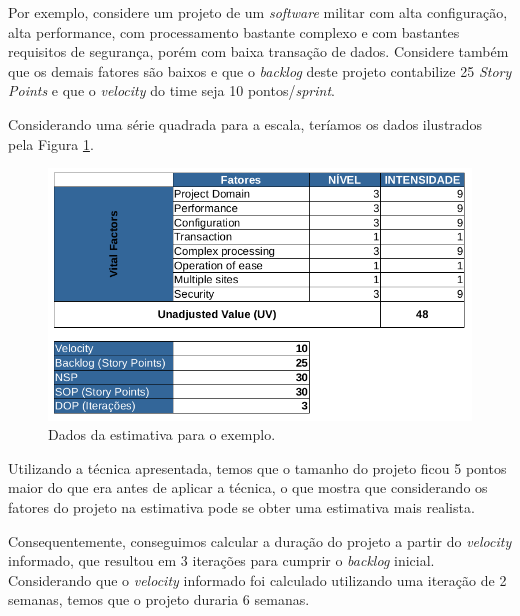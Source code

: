 Por exemplo, considere um projeto de um \textit{software} militar com alta configuração, alta performance, 
com processamento bastante complexo e com bastantes requisitos de segurança, porém com baixa transação de dados.
Considere também que os demais fatores são baixos e que o \textit{backlog} deste projeto 
contabilize 25 \textit{Story Points} e que o \textit{velocity} do time seja 10 pontos/\textit{sprint}.

Considerando uma série quadrada para a escala, teríamos os dados ilustrados pela Figura \ref{example-data}.

  \begin{figure}[!htb]
    \centering
    \includegraphics[scale=0.55]{figuras/example-data}
    \caption{Dados da estimativa para o exemplo.}
    \label{example-data}
  \end{figure}
  
Utilizando a técnica apresentada, temos que o tamanho do projeto ficou 5 pontos maior do que era antes de aplicar a técnica,
o que mostra que considerando os fatores do projeto na estimativa pode se obter uma estimativa mais realista.

Consequentemente, conseguimos calcular a duração do projeto a partir do \textit{velocity} informado, que resultou em 3 
iterações para cumprir o \textit{backlog} inicial. Considerando que o \textit{velocity} informado foi calculado utilizando
uma iteração de 2 semanas, temos que o projeto duraria 6 semanas.


